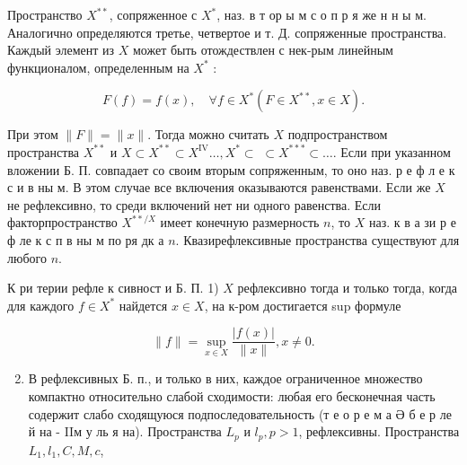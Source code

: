 \documentclass[10pt]{article}
\begin{document}
Пространство $X^{* *}$, сопряженное с $X^{*}$, наз. в т ор ы м с о п р я же н н ы м. Аналогично определяются третье, четвертое и т. Д. сопряженные пространства. Каждый элемент из $X$ может быть отождествлен с нек-рым линейным функционалом, определенным на $X^{*}$ :



\[

F(f)=f(x), \quad \forall f \in X^{*}\left(F \in X^{* *}, x \in X\right) .

\]



При этом $\|F\|=\|x\|$. Тогда можно считать $X$ подпространством пространства $X^{* *}$ и $X \subset X^{* *} \subset X^{\mathrm{IV}} \ldots, X^{*} \subset$ $\subset X^{* * *} \subset \ldots$. Если при указанном вложении Б. П. совпадает со своим вторым сопряженным, то оно наз. р е ф л е к с и в ны м. В этом случае все включения оказываются равенствами. Если же $X$ не рефлексивно, то среди включений нет ни одного равенства. Если факторпространство $X^{* * / X}$ имеет конечную размерность $n$, то $X$ наз. к в а зи р е ф ле к с п в ны м по ря дк а $n$. Квазирефлексивные пространства существуют для любого $n$.



К ри терии рефле к сивност и Б. П. 1) $X$ рефлексивно тогда и только тогда, когда для каждого $f \in X^{*}$ найдется $x \in X$, на к-ром достигается sup формуле



\[

\|f\|=\sup _{x \in X} \frac{|f(x)|}{\|x\|}, x \neq 0 .

\]



\begin{enumerate}

  \setcounter{enumi}{1}

  \item В рефлексивных Б. п., и только в них, каждое ограниченное множество компактно относительно слабой сходимости: любая его бесконечная часть содержит слабо сходящуюся подпоследовательность (т е о р е м а $Ә$ б е р ле й на - IIм у ль я на). Пространства $L_{p}$ и $l_{p}, p>1$, рефлексивны. Пространства $L_{1}, l_{1}, C, M, c$,

\end{enumerate}
\end{document}
